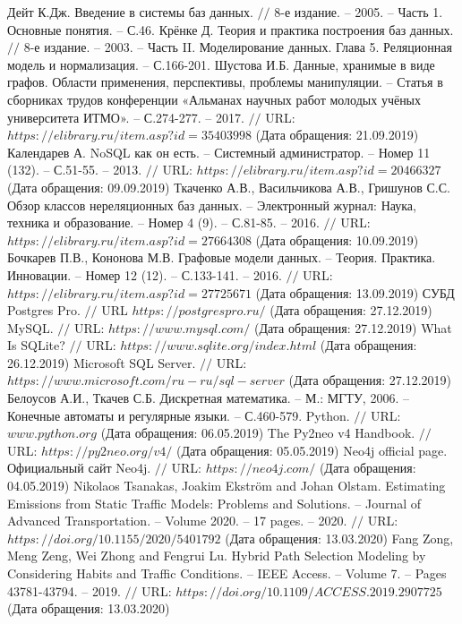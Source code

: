 \begin{thebibliography}{00}
	Дейт К.Дж. Введение в системы баз данных. $//$ 8-е издание. -- 2005. -- Часть 1. Основные понятия. -- С.46.
	Крёнке Д. Теория и практика построения баз данных. $//$ 8-е издание. -- 2003. -- Часть II. Моделирование данных. Глава 5. Реляционная модель и нормализация. -- С.166-201.
	Шустова И.Б. Данные, хранимые в виде графов. Области применения, перспективы, проблемы манипуляции. -- Статья в сборниках трудов конференции «Альманах научных работ молодых учёных университета ИТМО». -- С.274-277. -- 2017. $//$ URL: $https://elibrary.ru/item.asp?id=35403998$ (Дата обращения: 21.09.2019)
	Календарев А. NoSQL как он есть. -- Системный администратор. -- Номер 11 (132). -- С.51-55. -- 2013. $//$ URL: $https://elibrary.ru/item.asp?id=20466327$ (Дата обращения: 09.09.2019)
	Ткаченко А.В., Васильчикова А.В., Гришунов С.С. Обзор классов нереляционных баз данных. -- Электронный журнал: Наука, техника и образование. -- Номер 4 (9). -- С.81-85. -- 2016. $//$ URL: $https://elibrary.ru/item.asp?id=27664308$ (Дата обращения: 10.09.2019)
	Бочкарев П.В., Кононова М.В. Графовые модели данных. -- Теория. Практика. Инновации. -- Номер 12 (12). -- С.133-141. -- 2016. $//$ URL: $https://elibrary.ru/item.asp?id=27725671$ (Дата обращения: 13.09.2019)
	СУБД Postgres Pro. $//$ URL $https://postgrespro.ru/$ (Дата обращения: 27.12.2019)
	MySQL. $//$ URL: $https://www.mysql.com/$ (Дата обращения: 27.12.2019)
	What Is SQLite? $//$ URL: $https://www.sqlite.org/index.html$ (Дата обращения: 26.12.2019)
	Microsoft SQL Server. $//$ URL: $https://www.microsoft.com/ru-ru/sql-server$ (Дата обращения: 27.12.2019)
	Белоусов А.И., Ткачев С.Б. Дискретная математика. -- М.: МГТУ, 2006. -- Конечные автоматы и регулярные языки. -- С.460-579.
	Python. $//$ URL: $www.python.org$ (Дата обращения: 06.05.2019)
	The Py2neo v4 Handbook. $//$ URL: $https://py2neo.org/v4/$ (Дата обращения: 05.05.2019)
	Neo4j official page. Официальный сайт Neo4j. $//$ URL: $https://neo4j.com/$ (Дата обращения: 04.05.2019)
	Nikolaos Tsanakas, Joakim Ekström and Johan Olstam. Estimating Emissions from Static Traffic Models: Problems and Solutions. -- Journal of Advanced Transportation. -- Volume 2020. -- 17 pages. -- 2020. $//$ URL: $https://doi.org/10.1155/2020/5401792$ (Дата обращения: 13.03.2020)
	Fang Zong, Meng Zeng, Wei Zhong and Fengrui Lu. Hybrid Path Selection Modeling by Considering Habits and Traffic Conditions. -- IEEE Access. -- Volume 7. -- Pages 43781-43794. -- 2019. $//$ URL: $https://doi.org/10.1109/ACCESS.2019.2907725$ (Дата обращения: 13.03.2020)

\end{thebibliography}
